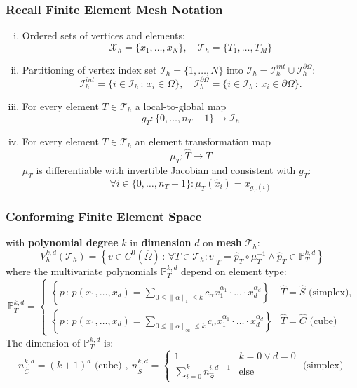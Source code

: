 \documentclass[aspectratio=169,11pt]{beamer}
\theoremstyle{definition}
\begin{document}
\begin{frame}
\frametitle{Recall Finite Element Mesh Notation}
\begin{enumerate}[i)]
\item Ordered sets of vertices and elements:
$$\mathcal{X}_h = \{x_1,\ldots,x_N\}, \quad\mathcal{T}_h = \{T_1, \ldots, T_M\}$$
\item Partitioning of vertex index set $\mathcal{I}_h=\{1,\ldots,N\}$ into $
\mathcal{I}_h = \mathcal{I}_h^{int}\cup\mathcal{I}_h^{\partial\Omega}$:
\begin{equation*}
\mathcal{I}_h^{int} = \{i\in \mathcal{I}_h\,:\, x_i\in\Omega\},
\quad \mathcal{I}_h^{\partial\Omega} = \{i\in \mathcal{I}_h\,:\, x_i\in\partial\Omega\}.
\end{equation*}
\item For every element $T\in\mathcal{T}_h$ a local-to-global map
$$g_T:\{0,\ldots,n_T-1\}\to\mathcal{I}_h$$
\item For every element $T\in\mathcal{T}_h$ an element transformation map
$$\mu_T : \hat T \to T$$
$\mu_T$ is differentiable with invertible Jacobian and consistent with $g_T$:
$$\forall i\in\{0,\ldots,n_T-1\} : \mu_T(\hat x_i) = x_{g_T(i)}$$
\end{enumerate}
\end{frame}

\begin{frame}
\frametitle{Conforming Finite Element Space}
with \textbf{polynomial degree} $k$ in \textbf{dimension} $d$ on \textbf{mesh} $\mathcal{T}_h$:
\begin{equation*}
V_h^{k,d}(\mathcal{T}_h) = \left\{ v\in C^0(\overline{\Omega}) \,:\,
\forall T\in\mathcal{T}_h : v|_T = \hat p_T \circ \mu_T^{-1} \wedge \hat p_T\in\mathbb{P}_T^{k,d}\right\}
\end{equation*}
where the multivariate polynomials $\mathbb{P}_T^{k,d}$ depend on element type:
{\small\begin{equation*}
\mathbb{P}_T^{k,d} = \left\{\begin{array}{ll}
\left\{ p\,:\, p(x_1,\ldots,x_d) = \sum\limits_{0\leq\|\alpha\|_1\leq k} c_\alpha
x_1^{\alpha_1}\cdot\ldots\cdot x_d^{\alpha_d}\right\} & \text{$\hat T = \hat S$ (simplex)}, \\
\left\{ p\,:\, p(x_1,\ldots,x_d) = \sum\limits_{0\leq\|\alpha\|_\infty\leq k} c_\alpha
x_1^{\alpha_1}\cdot\ldots\cdot x_d^{\alpha_d}\right\} & \text{$\hat T = \hat C$ (cube)}
\end{array}\right .
\end{equation*}}
The dimension of $\mathbb{P}^{k,d}_T$ is:
\begin{equation*}
n_{\hat C}^{k,d} = (k+1)^d \text{ (cube) },  \
n_{\hat S}^{k,d} = \left\{ \begin{array}{ll}
1 & k=0 \vee d=0\\
\sum\limits_{i=0}^k n_{\hat S}^{i,d-1} &\text{else}
\end{array}\right . \text{ (simplex) }
\end{equation*}
\end{frame}
\end{document}

